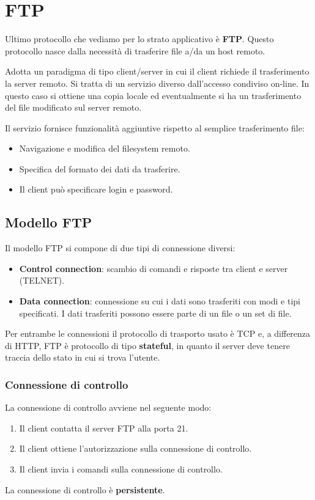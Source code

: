 \section{FTP}
Ultimo protocollo che vediamo per lo strato applicativo è \textbf{FTP}.
Questo protocollo nasce dalla necessità di trasferire file a/da un host
remoto.

Adotta un paradigma di tipo client/server in cui il client richiede il 
trasferimento la server remoto. Si tratta di un servizio diverso 
dall'accesso condiviso on-line. In questo caso si ottiene una copia 
locale ed eventualmente si ha un trasferimento del file modificato sul 
server remoto.

Il servizio fornisce funzionalità aggiuntive rispetto al semplice 
trasferimento file:
\begin{itemize}
	\item Navigazione e modifica del filesystem remoto.
	\item Specifica del formato dei dati da trasferire.
	\item Il client può specificare login e password.
\end{itemize}

\subsection{Modello FTP}
Il modello FTP si compone di due tipi di connessione diversi:
\begin{itemize}
	\item \textbf{Control connection}: scambio di comandi e risposte 
		tra client e server (TELNET).
	\item \textbf{Data connection}: connessione su cui i dati sono 
		trasferiti con modi e tipi specificati. I dati trasferiti 
		possono essere parte di un file o un set di file.
\end{itemize}
Per entrambe le connessioni il protocollo di trasporto usato è TCP e, a
differenza di HTTP, FTP è protocollo di tipo \textbf{stateful}, in 
quanto il server deve tenere traccia dello stato in cui si trova 
l'utente.

\subsubsection{Connessione di controllo}
La connessione di controllo avviene nel seguente modo:
\begin{enumerate}
	\item Il client contatta il server FTP alla porta 21.
	\item Il client ottiene l'autorizzazione sulla connessione di 
		controllo.
	\item Il client invia i comandi sulla connessione di controllo.
\end{enumerate}
La connessione di controllo è \textbf{persistente}.

